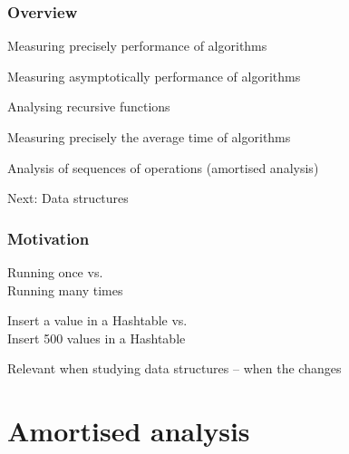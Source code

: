 \documentclass[aspectratio=169]{beamer}
\begin{document}
\frame[plain]{\titlepage}


\begin{frame}[t]\frametitle{Overview}


  \begin{itemize}
    {\color{black!25}
    \item Measuring {precisely} performance of algorithms
    \item Measuring {asymptotically} performance of algorithms
    \item Analysing {recursive} functions
    \item Measuring {precisely} the {average time} of algorithms}
    \item Analysis of sequences of operations (\alert{amortised analysis})
    {\color{black!25}
    \item Next: Data structures
    }
  \end{itemize}
\end{frame}


\begin{frame}\frametitle{Motivation}
  \centering

  \begin{block}{}
    Running once \alert{vs.}\\
    Running many times
  \end{block}

  \begin{block}{}
    Insert a value in a Hashtable \alert{vs.}\\
    Insert 500 values in a Hashtable
  \end{block}

  \bigskip
  {\Large Relevant when studying data structures -- when the  changes}


\end{frame}


\section{Amortised analysis}


\end{document}
